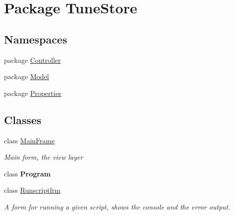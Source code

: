 \hypertarget{namespace_tune_store}{\section{Package Tune\+Store}
\label{namespace_tune_store}
}
\subsection*{Namespaces}
\begin{DoxyCompactItemize}
\item 
package \hyperlink{namespace_tune_store_1_1_controller}{Controller}
\item 
package \hyperlink{namespace_tune_store_1_1_model}{Model}
\item 
package \hyperlink{namespace_tune_store_1_1_properties}{Properties}
\end{DoxyCompactItemize}
\subsection*{Classes}
\begin{DoxyCompactItemize}
\item 
class \hyperlink{class_tune_store_1_1_main_frame}{Main\+Frame}
\begin{DoxyCompactList}\small\item\em Main form, the view layer \end{DoxyCompactList}\item 
class {\bfseries Program}
\item 
class \hyperlink{class_tune_store_1_1_runscriptfrm}{Runscriptfrm}
\begin{DoxyCompactList}\small\item\em A form for running a given script, shows the console and the error output. \end{DoxyCompactList}\end{DoxyCompactItemize}
